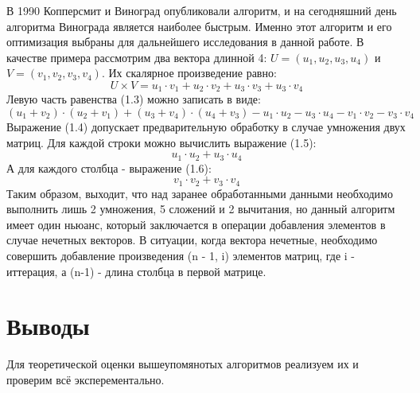 В 1990 Копперсмит и Виноград опубликовали алгоритм, и на сегодняшний день алгоритма Винограда является наиболее быстрым. Именно этот алгоритм и его оптимизация выбраны для дальнейшего исследования в данной работе.
В качестве примера рассмотрим два вектора длинной 4: $U = (u_1, u_2, u_3, u_4)$ и $V = (v_1, v_2, v_3, v_4)$. Их скалярное произведение равно:
\begin{equation}
    U\times{}V = u_1\cdot{}v_1 + u_2\cdot{}v_2 + u_3\cdot{}v_3 + u_3\cdot{}v_4
\end{equation}
Левую часть равенства (1.3) можно записать в виде:
\begin{equation}
    (u_1 + v_2)\cdot{}(u_2 + v_1) + (u_3 + v_4)\cdot{}(u_4 + v_3) - u_1\cdot{}u_2 - u_3\cdot{}u_4 - v_1\cdot{}v_2 - v_3\cdot{}v_4
\end{equation}
Выражение (1.4) допускает предварительную обработку в случае умножения двух матриц. Для каждой строки можно вычислить выражение (1.5):
\begin{equation}
    u_1\cdot{}u_2 + u_3\cdot{}u_4
\end{equation}
А для каждого столбца - выражение (1.6):
\begin{equation}
    v_1\cdot{}v_2 + v_3\cdot{}v_4
\end{equation}
Таким образом, выходит, что над заранее обработанными данными необходимо выполнить лишь 2 умножения, 5 сложений и 2 вычитания, но данный алгоритм имеет один ньюанс, который заключается в операции добавления элементов в случае нечетных векторов.
В ситуации, когда вектора нечетные, необходимо совершить добавление произведения (n - 1, i) элементов матриц, где i - иттерация, а (n-1) - длина столбца в первой матрице.


\newpage

\section{Выводы}
Для теоретической оценки вышеупомянотых алгоритмов реализуем их и проверим всё эксперементально.
